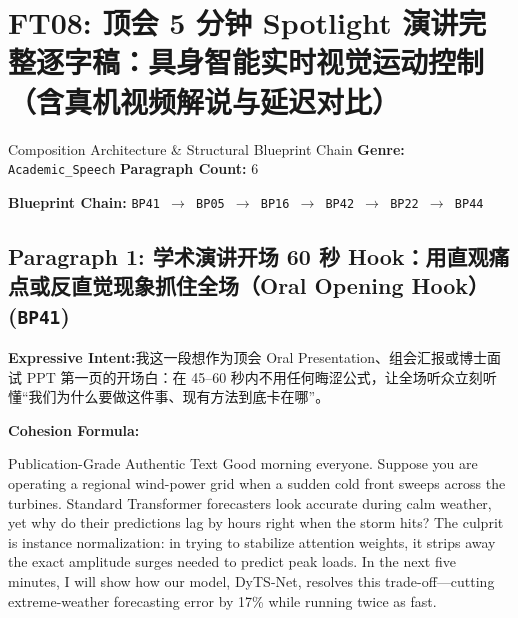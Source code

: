 \section{FT08: 顶会 5 分钟 Spotlight 演讲完整逐字稿：具身智能实时视觉运动控制（含真机视频解说与延迟对比）}\label{comp:FT08}
\begin{ConceptBox}{Composition Architecture \& Structural Blueprint Chain}
\textbf{Genre:} \texttt{Academic\_Speech} \quad \textbf{Paragraph Count:} 6\par
\textbf{Blueprint Chain:} \texttt{BP41 $\to$ BP05 $\to$ BP16 $\to$ BP42 $\to$ BP22 $\to$ BP44}
\end{ConceptBox}
\subsection*{Paragraph 1: 学术演讲开场 60 秒 Hook：用直观痛点或反直觉现象抓住全场（Oral Opening Hook） (\texttt{BP41})}
\noindent\textbf{Expressive Intent:}\enspace 我这一段想作为顶会 Oral Presentation、组会汇报或博士面试 PPT 第一页的开场白：在 45--60 秒内不用任何晦涩公式，让全场听众立刻听懂“我们为什么要做这件事、现有方法到底卡在哪”。\par
\noindent\textbf{Cohesion Formula:}\par\vspace{4pt}
\begin{ExampleBox}{Publication-Grade Authentic Text}
Good morning everyone. Suppose you are operating a regional wind-power grid when a sudden cold front sweeps across the turbines. Standard Transformer forecasters look accurate during calm weather, yet why do their predictions lag by hours right when the storm hits? The culprit is instance normalization: in trying to stabilize attention weights, it strips away the exact amplitude surges needed to predict peak loads. In the next five minutes, I will show how our model, DyTS-Net, resolves this trade-off---cutting extreme-weather forecasting error by 17\% while running twice as fast.
\end{ExampleBox}
